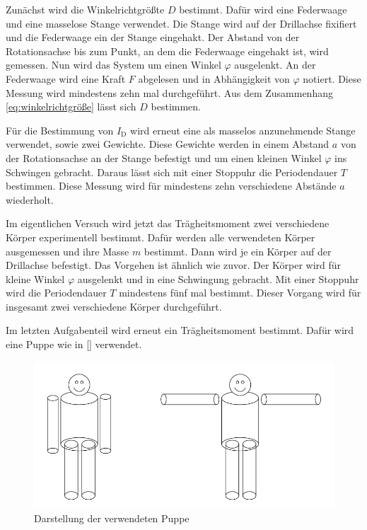 Zunächst wird die Winkelrichtgrößte $D$ bestimmt. 
Dafür wird eine Federwaage und eine masselose Stange verwendet.
Die Stange wird auf der Drillachse fixifiert und die Federwaage ein der Stange eingehakt. 
Der Abstand von der Rotationsachse bis zum Punkt, an dem die Federwaage eingehakt ist, wird gemessen.
Nun wird das System um einen Winkel $\varphi$ ausgelenkt. 
An der Federwaage wird eine Kraft $F$ abgelesen und in Abhängigkeit von $\varphi$ notiert. 
Diese Messung wird mindestens zehn mal durchgeführt. 
Aus dem Zusammenhang \autoref{eq:winkelrichtgröße} lässt sich $D$ bestimmen.

Für die Bestimmung von $I_\text{D}$ wird erneut eine als masselos anzunehmende Stange verwendet, sowie zwei Gewichte.
Diese Gewichte werden in einem Abstand $a$ von der Rotationsachse an der Stange befestigt und um einen kleinen Winkel $\varphi$ ins Schwingen gebracht. 
Daraus lässt sich mit einer Stoppuhr die Periodendauer $T$ bestimmen. 
Diese Messung wird für mindestens zehn verschiedene Abstände $a$ wiederholt. 

Im eigentlichen Versuch wird jetzt das Trägheitsmoment zwei verschiedene Körper experimentell bestimmt. 
Dafür werden alle verwendeten Körper ausgemessen und ihre Masse $m$ bestimmt. 
Dann wird je ein Körper auf der Drillachse befestigt. 
Das Vorgehen ist ähnlich wie zuvor. 
Der Körper wird für kleine Winkel $\varphi$ ausgelenkt und in eine Schwingung gebracht. 
Mit einer Stoppuhr wird die Periodendauer $T$ mindestens fünf mal bestimmt. 
Dieser Vorgang wird für insgesamt zwei verschiedene Körper durchgeführt.

Im letzten Aufgabenteil wird erneut ein Trägheitsmoment bestimmt. Dafür wird eine Puppe wie in \autoref{} verwendet.

\begin{figure}
    \centering
    \includegraphics[width=\textwidth/2]{images/puppe.png}
    \caption{Darstellung der verwendeten Puppe \cite{V101}}
    \label{fig:puppe}
\end{figure}

